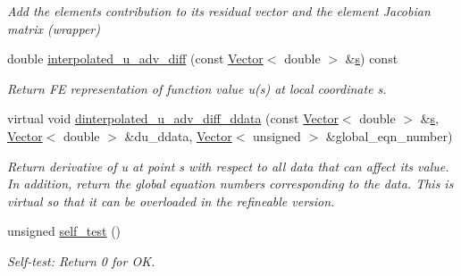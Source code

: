 \begin{DoxyCompactItemize}
\begin{DoxyCompactList}\small\item\em Add the element\textquotesingle{}s contribution to its residual vector and the element Jacobian matrix (wrapper) \end{DoxyCompactList}\item 
double \hyperlink{classoomph_1_1SteadyAxisymAdvectionDiffusionEquations_a9a7e5c2649193e0bda6f8e749ce53154}{interpolated\+\_\+u\+\_\+adv\+\_\+diff} (const \hyperlink{classoomph_1_1Vector}{Vector}$<$ double $>$ \&\hyperlink{cfortran_8h_ab7123126e4885ef647dd9c6e3807a21c}{s}) const
\begin{DoxyCompactList}\small\item\em Return FE representation of function value u(s) at local coordinate s. \end{DoxyCompactList}\item 
virtual void \hyperlink{classoomph_1_1SteadyAxisymAdvectionDiffusionEquations_a11120f6c10f689ac0406054f3c026eda}{dinterpolated\+\_\+u\+\_\+adv\+\_\+diff\+\_\+ddata} (const \hyperlink{classoomph_1_1Vector}{Vector}$<$ double $>$ \&\hyperlink{cfortran_8h_ab7123126e4885ef647dd9c6e3807a21c}{s}, \hyperlink{classoomph_1_1Vector}{Vector}$<$ double $>$ \&du\+\_\+ddata, \hyperlink{classoomph_1_1Vector}{Vector}$<$ unsigned $>$ \&global\+\_\+eqn\+\_\+number)
\begin{DoxyCompactList}\small\item\em Return derivative of u at point s with respect to all data that can affect its value. In addition, return the global equation numbers corresponding to the data. This is virtual so that it can be overloaded in the refineable version. \end{DoxyCompactList}\item 
unsigned \hyperlink{classoomph_1_1SteadyAxisymAdvectionDiffusionEquations_a2e50d7fafef6baa759e2807765ddc364}{self\+\_\+test} ()
\begin{DoxyCompactList}\small\item\em Self-\/test\+: Return 0 for OK. \end{DoxyCompactList}\end{DoxyCompactItemize}
